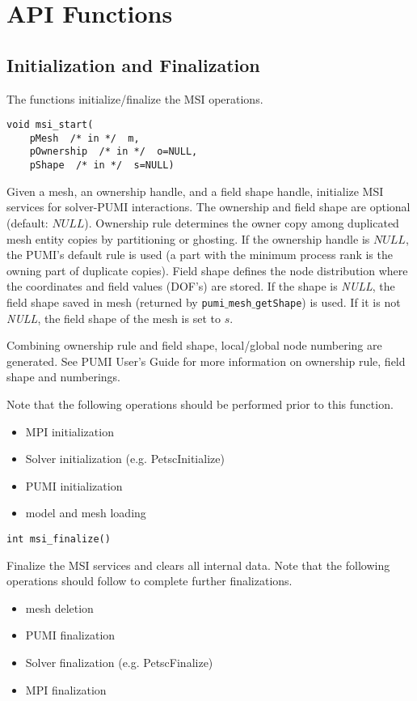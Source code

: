 \section{API Functions}

\subsection{Initialization and Finalization}

The functions initialize/finalize the MSI operations.

\begin{verbatim}
void msi_start(
    pMesh  /* in */  m, 
    pOwnership  /* in */  o=NULL, 
    pShape  /* in */  s=NULL)
\end{verbatim}\vspace{-.5cm}\hspace{1cm}
Given a mesh, an ownership handle, and a field shape handle, initialize MSI services for solver-PUMI interactions. The ownership and field shape are optional (default: $NULL$). Ownership rule determines the owner copy among duplicated mesh entity copies by partitioning or ghosting. If the ownership handle is $NULL$, the PUMI's default rule is used (a part with the minimum process rank is the owning part of duplicate copies). Field shape defines the node distribution where the coordinates and field values (DOF's) are stored. If the shape is \emph{NULL}, the field shape saved in mesh (returned by \texttt{pumi$\_$mesh$\_$getShape}) is used. If it is not \textit{NULL}, the field shape of the mesh is set to $s$.

Combining ownership rule and field shape, local/global node numbering are generated.
See PUMI User's Guide for more information on ownership rule, field shape and numberings.

Note that the following operations should be performed prior to this function.
\begin{itemize}
\item MPI initialization
\item Solver initialization (e.g. PetscInitialize)
\item PUMI initialization 
\item model and mesh loading
\end{itemize}

\begin{verbatim}
int msi_finalize()
\end{verbatim}\vspace{-.5cm}\hspace{1cm}
Finalize the MSI services and clears all internal data. Note that the following operations should follow to complete further finalizations.
\begin{itemize}
\item mesh deletion
\item PUMI finalization
\item Solver finalization (e.g. PetscFinalize)
\item MPI finalization
\end{itemize}

